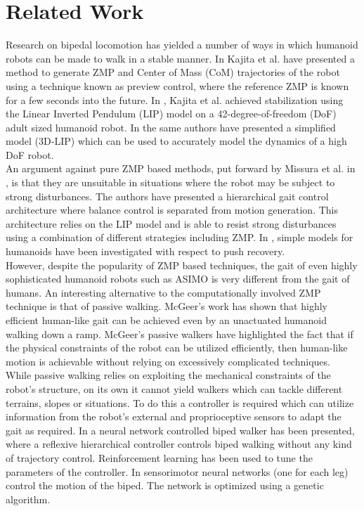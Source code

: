 \documentclass[12pt,twoside]{article}
\theoremstyle{plain}
\theoremstyle{definition}
\theoremstyle{remark}
\newcommand{\forceindent}{\leavevmode{\parindent=2em\indent}}
\begin{document}
\section{Related Work}
\label{sec:Related_Work}
Research on bipedal locomotion has yielded a number of  ways in which humanoid robots can be made to walk in a stable manner. In \cite{kajita2003biped} Kajita et al. have presented a method to generate ZMP and Center of Mass (CoM) trajectories of the robot using a technique known as preview control, where the reference ZMP is known for a few seconds into the future. In \cite{kajita2010biped}, Kajita et al. achieved stabilization using the Linear Inverted Pendulum (LIP) model on a 42-degree-of-freedom (DoF) adult sized humanoid robot. In \cite{kajita20013d} the same authors have presented a simplified model (3D-LIP) which can be used to accurately model the dynamics of a high DoF robot.\\
\forceindent An argument against pure ZMP based methods, put forward by Missura et al. in \cite{missura2013omnidirectional, missura2014online, missura2015gradient}, is that they are unsuitable in situations where the robot may be subject to strong disturbances. The authors have presented a hierarchical gait control architecture where balance control is separated from motion generation. This architecture relies on the LIP model and is able to resist strong disturbances using a combination of different strategies including ZMP. In \cite{stephens2007humanoid}, simple models for humanoids have been investigated with respect to push recovery.\\
\forceindent However, despite the popularity of ZMP based techniques, the gait of even highly sophisticated humanoid robots such as ASIMO is very different from the gait of humans. An interesting alternative to the computationally involved ZMP technique is that of passive walking. McGeer's work \cite{mcgeer1990passive} has shown that highly efficient human-like gait can be achieved even by an unactuated humanoid walking down a ramp. McGeer's passive walkers have highlighted the fact that if the physical constraints of the robot can be utilized efficiently, then human-like motion is achievable without relying on excessively complicated techniques.\\
\forceindent While passive walking relies on exploiting the mechanical constraints of the robot's structure, on its own it cannot yield walkers which can tackle different terrains, slopes or situations. To do this a controller is required which can utilize information from the robot's external and proprioceptive sensors to adapt the gait as required. In \cite{geng2005fast} a neural network controlled biped walker has been presented, where a reflexive hierarchical controller controls biped walking without any kind of trajectory control. Reinforcement learning has been used to tune the parameters of the controller. In \cite{paul2005sensorimotor} sensorimotor neural networks (one for each leg) control the motion of the biped. The network is optimized using a genetic algorithm.\\
\end{document}
